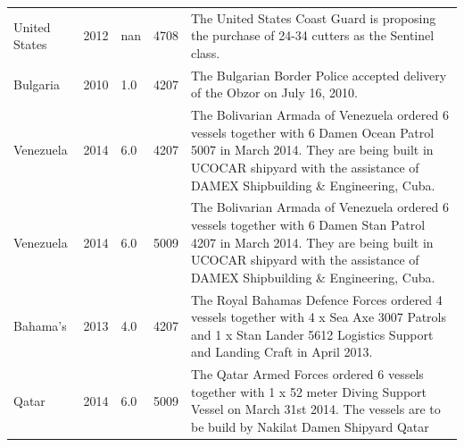 \documentclass{article}
\begin{document}
\begin{tabular}{lllll}
United States & 2012 & nan & 4708 & The United States Coast Guard is proposing the purchase of 24-34 cutters as the Sentinel class. \\
Bulgaria & 2010 & 1.0 & 4207 & The Bulgarian Border Police accepted delivery of the Obzor on July 16, 2010. \\
Venezuela & 2014 & 6.0 & 4207 & The Bolivarian Armada of Venezuela ordered 6 vessels together with 6 Damen Ocean Patrol 5007 in March 2014. They are being built in UCOCAR shipyard with the assistance of DAMEX Shipbuilding \& Engineering, Cuba. \\
Venezuela & 2014 & 6.0 & 5009 & The Bolivarian Armada of Venezuela ordered 6 vessels together with 6 Damen Stan Patrol 4207 in March 2014. They are being built in UCOCAR shipyard with the assistance of DAMEX Shipbuilding \& Engineering, Cuba. \\
Bahama's & 2013 & 4.0 & 4207 & The Royal Bahamas Defence Forces ordered 4 vessels together with 4 x Sea Axe 3007 Patrols and 1 x Stan Lander 5612 Logistics Support and Landing Craft in April 2013. \\
Qatar & 2014 & 6.0 & 5009 & The Qatar Armed Forces ordered 6 vessels together with 1 x 52 meter Diving Support Vessel on March 31st 2014. The vessels are to be build by Nakilat Damen Shipyard Qatar \\
\bottomrule
\end{tabular}
\end{document}
